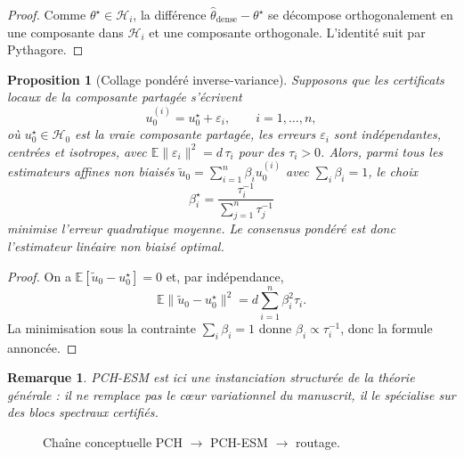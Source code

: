 \documentclass[11pt,a4paper]{article}
\newtheorem{proposition}{Proposition}[section]
\newtheorem{remark}{Remarque}[section]
\DeclareMathOperator{\argmin}{argmin}
\newcommand{\Hh}{\mathcal H}
\begin{document}
\begin{proof}
Comme \(\theta^\star\in\Hh_i\), la différence \(\hat\theta_{\mathrm{dense}}-\theta^\star\) se décompose orthogonalement en une composante dans \(\Hh_i\) et une composante orthogonale. L'identité suit par Pythagore.
\end{proof}

\begin{proposition}[Collage pondéré inverse-variance]
Supposons que les certificats locaux de la composante partagée s'écrivent
\[
u_0^{(i)} = u_0^\star + \varepsilon_i,\qquad i=1,\dots,n,
\]
où \(u_0^\star\in\Hh_0\) est la vraie composante partagée, les erreurs \(\varepsilon_i\) sont indépendantes, centrées et isotropes, avec \(\mathbb E\|\varepsilon_i\|^2 = d\,\tau_i\) pour des \(\tau_i>0\). Alors, parmi tous les estimateurs affines non biaisés \(\tilde u_0=\sum_{i=1}^n \beta_i u_0^{(i)}\) avec \(\sum_i\beta_i=1\), le choix
\[
\beta_i^\star=\frac{\tau_i^{-1}}{\sum_{j=1}^n \tau_j^{-1}}
\]
minimise l'erreur quadratique moyenne. Le consensus pondéré est donc l'estimateur linéaire non biaisé optimal.
\end{proposition}

\begin{proof}
On a \(\mathbb E[\tilde u_0-u_0^\star]=0\) et, par indépendance,
\[
\mathbb E\|\tilde u_0-u_0^\star\|^2
=
 d\sum_{i=1}^n \beta_i^2 \tau_i.
\]
La minimisation sous la contrainte \(\sum_i\beta_i=1\) donne \(\beta_i\propto \tau_i^{-1}\), donc la formule annoncée.
\end{proof}

\begin{remark}
PCH-ESM est ici une instanciation structurée de la théorie générale : il ne remplace pas le cœur variationnel du manuscrit, il le spécialise sur des blocs spectraux certifiés.
\end{remark}

\begin{figure}[ht]
\centering
{}
\caption{Chaîne conceptuelle PCH \(\rightarrow\) PCH-ESM \(\rightarrow\) routage.}
\end{figure}
\end{document}

